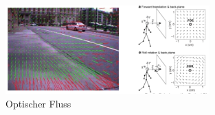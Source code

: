 \begin{figure}[h!]
	\centering
	\includegraphics[width=0.7\textwidth]{figures/ch04_optflow.png}
	\caption{Optischer Fluss}
	\label{optflow}
\end{figure}
\newpage